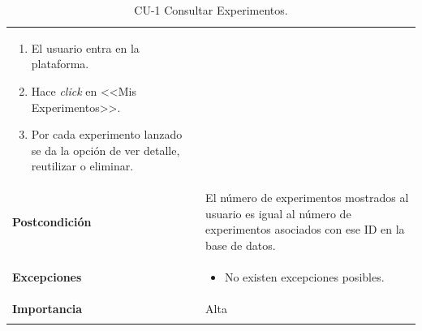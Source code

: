 \begin{longtable}[H]{@{}ll@{}}
\begin{minipage}[t]{0.71\columnwidth}
\begin{enumerate}
\def\labelenumi{\arabic{enumi}.}
\tightlist
\item El usuario entra en la plataforma.
\item Hace \textit{click} en <<Mis Experimentos>>.
\item Por cada experimento lanzado se da la opción de ver detalle, reutilizar o eliminar.
\end{enumerate}\strut
\end{minipage}\tabularnewline
\begin{minipage}[t]{0.23\columnwidth}\raggedright\strut
\textbf{Postcondición}\strut
\end{minipage} & \begin{minipage}[t]{0.71\columnwidth}\raggedright\strut
El número de experimentos mostrados al usuario es igual al número de experimentos asociados con ese ID en la base de datos.\strut
\end{minipage}\tabularnewline
\begin{minipage}[t]{0.23\columnwidth}\raggedright\strut
\textbf{Excepciones}\strut
\end{minipage} & \begin{minipage}[t]{0.71\columnwidth}\raggedright\strut
\begin{itemize}
\tightlist
\item No existen excepciones posibles.
\end{itemize}\strut
\end{minipage}\tabularnewline
\begin{minipage}[t]{0.23\columnwidth}\raggedright\strut
\textbf{Importancia}\strut
\end{minipage} & \begin{minipage}[t]{0.71\columnwidth}\raggedright\strut
Alta\strut
\end{minipage}\tabularnewline
\bottomrule
\caption{CU-1 Consultar Experimentos.}
\end{longtable}

